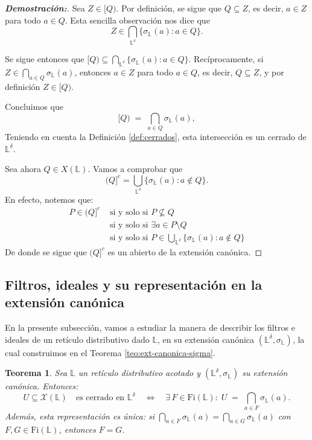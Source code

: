 \documentclass[12pt]{book}
\newtheorem{theorem}{Teorema}[section]
\begin{document}
\begin{proof}[\textbf{Demostración:}]
Sea $Z\in[Q)$. Por definición, se sigue que $Q\subseteq Z$, es decir, $a\in Z$ para todo
$a\in Q$. Esta sencilla observación nos dice que
\[ Z \in \bigcap_{\mathbb{L}^{\delta}} \{ \sigma_{\mathbb{L}}(a) \colon a \in Q\}. \]

Se sigue entonces que $[Q) \subseteq \bigcap_{\mathbb{L}^{\delta}} \{ \sigma_{\mathbb{L}}(a) \colon a \in Q\}$. Recíprocamente, si $Z\in\bigcap_{a\in Q}\sigma_{\mathbb L}(a)$, entonces
$a\in Z$ para todo $a\in Q$, es decir, $Q\subseteq Z$, y por definición
$Z\in[Q)$.

Concluimos que
\[
[Q)\;=\;\bigcap_{a\in Q}\sigma_{\mathbb L}(a),
\]
Teniendo en cuenta la Definición \ref{def:cerrados}, esta intersección es un cerrado de $\mathbb L^\delta$.

Sea  ahora $Q \in X(\mathbb{L})$. Vamos a comprobar que 
\[ (Q]^{c}  = \bigcup_{\mathbb{L}^{\delta}} \{ \sigma_{\mathbb{L}}(a) \colon a \notin Q \}. \]
En efecto, notemos que: 
\begin{align*}
P \in (Q]^{c} & \text{ si y solo si } P \not \subseteq Q \\
              & \text{ si y solo si } \exists a \in P\setminus Q \\
              & \text{ si y solo si } P \in \bigcup_{\mathbb{L}^{\delta}} \{\sigma_{\mathbb{L}}(a) \colon a \notin Q \}
\end{align*}
De donde se sigue que $(Q]^{c}$ es un abierto de la extensión canónica.
\end{proof}


\subsection{Filtros, ideales y su representación en la extensión canónica}

En la presente subsección, vamos a estudiar la manera de describir los filtros e ideales de un retículo distributivo dado $\mathbb{L}$, en su extensión canónica $\left( \mathbb{L}^{\delta},\sigma_{\mathbb{L}} \right)$, la cual construimos en el Teorema \ref{teo:ext-canonica-sigma}.


\begin{theorem}\label{thm:cerrados-filtros}
Sea \(\mathbb{L}\) un retículo distributivo acotado y $(\mathbb{L}^{\delta},\sigma_{\mathbb{L}})$ su extensión canónica. Entonces:
\[
U\subseteq\mathcal{X}(\mathbb{L})
\quad
\text{es cerrado en }\mathbb{L}^{\delta}
\quad\Longleftrightarrow\quad
\exists\,F\in\mathrm{Fi}(\mathbb{L}):\;
U \;=\;\bigcap_{a\in F}\sigma_{\mathbb{L}}(a).
\]
Además, esta representación es única: si \(\bigcap_{a\in F}\sigma_{\mathbb{L}}(a)
=\bigcap_{a\in G}\sigma_{\mathbb{L}}(a)\) con \(F,G\in\mathrm{Fi}(\mathbb{L})\), 
entonces \(F=G\).
\end{theorem}
\end{document}
